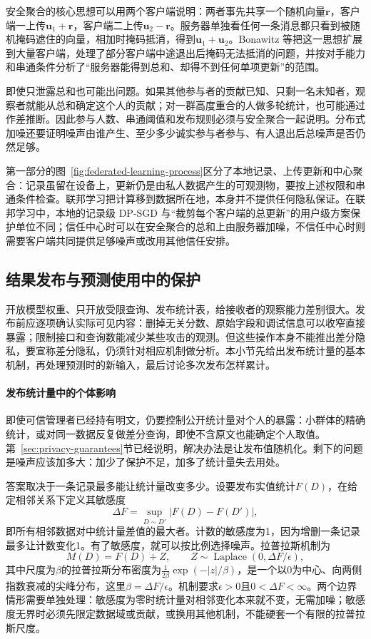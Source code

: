 安全聚合的核心思想可以用两个客户端说明：两者事先共享一个随机向量$\bm r$，客户端一上传$\bm u_1+\bm r$，客户端二上传$\bm u_2-\bm r$。服务器单独看任何一条消息都只看到被随机掩码遮住的向量，相加时掩码抵消，得到$\bm u_1+\bm u_2$。Bonawitz 等把这一思想扩展到大量客户端，处理了部分客户端中途退出后掩码无法抵消的问题，并按对手能力和串通条件分析了“服务器能得到总和、却得不到任何单项更新”的范围。

即使只泄露总和也可能出问题。如果其他参与者的贡献已知、只剩一名未知者，观察者就能从总和确定这个人的贡献；对一群高度重合的人做多轮统计，也可能通过作差推断。因此参与人数、串通阈值和发布规则必须与安全聚合一起说明。分布式加噪还要证明噪声由谁产生、至少多少诚实参与者参与、有人退出后总噪声是否仍然足够。

第一部分的图~\ref{fig:federated-learning-process}区分了本地记录、上传更新和中心聚合：记录虽留在设备上，更新仍是由私人数据产生的可观测物，要按上述权限和串通条件检查。联邦学习把计算移到数据所在地，本身并不提供任何隐私保证。在联邦学习中，本地的记录级 DP-SGD 与“裁剪每个客户端的总更新”的用户级方案保护单位不同；信任中心时可以在安全聚合的总和上由服务器加噪，不信任中心时则需要客户端共同提供足够噪声或改用其他信任安排。

\subsection{结果发布与预测使用中的保护}
\label{sec:privacy-statistical-release}

开放模型权重、只开放受限查询、发布统计表，给接收者的观察能力差别很大。发布前应逐项确认实际可见内容：删掉无关分数、原始字段和调试信息可以收窄直接暴露；限制接口和查询数能减少某些攻击的观测。但这些操作本身不能推出差分隐私，要宣称差分隐私，仍须针对相应机制做分析。本小节先给出发布统计量的基本机制，再处理预测时的新输入，最后讨论多次发布怎样累计。

\paragraph{发布统计量中的个体影响}

即使可信管理者已经持有明文，仍要控制公开统计量对个人的暴露：小群体的精确统计，或对同一数据反复做差分查询，即使不含原文也能确定个人取值。第~\ref{sec:privacy-guarantees}节已经说明，解决办法是让发布值随机化。剩下的问题是噪声应该加多大：加少了保护不足，加多了统计量失去用处。

答案取决于一条记录最多能让统计量改变多少。设要发布实值统计$F(D)$，在给定相邻关系下定义其敏感度
\[
 \Delta F=\sup_{D\sim D'}\lvert F(D)-F(D')\rvert,
\]
即所有相邻数据对中统计量差值的最大者。计数的敏感度为1，因为增删一条记录最多让计数变化1。有了敏感度，就可以按比例选择噪声。拉普拉斯机制为
\begin{equation}
 M(D)=F(D)+Z,\qquad
 Z\sim\operatorname{Laplace}(0,\Delta F/\epsilon),
 \label{eq:privacy-laplace}
\end{equation}
其中尺度为$\beta$的拉普拉斯分布密度为$\frac{1}{2\beta}\exp(-\lvert z\rvert/\beta)$，是一个以0为中心、向两侧指数衰减的尖峰分布，这里$\beta=\Delta F/\epsilon$。机制要求$\epsilon>0$且$0<\Delta F<\infty$。两个边界情形需要单独处理：敏感度为零时统计量对相邻变化本来就不变，无需加噪；敏感度无界时必须先限定数据域或贡献，或换用其他机制，不能硬套一个有限的拉普拉斯尺度。

